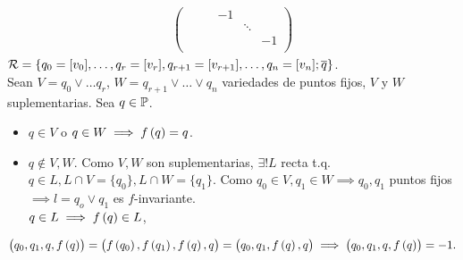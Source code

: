 \begin{obs}
\begin{gather*}
\begin{pmatrix}
            & & & -1 & & \\
            & & & & \ddots & \\
            & & & & & -1\\
        \end{pmatrix}
    \end{gather*}
    $\mathcal{R} = \{q_0 = [v_0], \dots, q_r=[v_r], q_{r+1} = [v_{r+1}], \dots, q_n = [v_n]; \overline{q}\}$.\\
    Sean $V = q_0 \vee \dots q_r$, $W = q_{r+1} \vee \dots \vee q_n$ variedades de puntos fijos, $V$ y $W$ suplementarias.
    Sea $q \in \mathbb{P}$.
    \begin{itemize}
        \item $q \in V$ o $q \in W \implies f\left( q\right)=q$.
        \item $q \notin V, W$. Como $V,W$ son suplementarias, $\exists! L$ recta t.q. $q\in L, L\cap V=\{q_0\}, L\cap W = \{q_1\}$. Como $q_0\in V, q_1 \in W \implies q_0, q_1$ puntos fijos $\implies l = q_o \vee q_1$ es $f$-invariante. \\
        $q \in L \implies f\left( q\right) \in L$,
    \end{itemize}
    \[\left( q_0, q_1, q, f\left( q\right)\right) = \left( f\left( q_0\right), f\left( q_1\right), f\left( q\right), q\right) = \left( q_0, q_1, f\left( q\right), q\right) \implies \left( q_0, q_1, q, f\left( q\right)\right) = -1.\] %
\end{obs}
